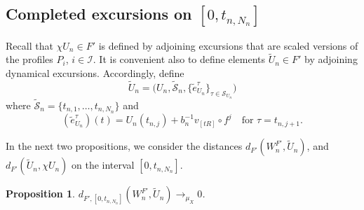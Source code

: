 \documentclass[12pt]{article}
\numberwithin{equation}{section}
\newtheorem{prop}[thm]{Proposition}
\newcommand{\cI}{{\mathcal I}}
\newcommand{\cS}{{\mathcal S}}
\newcommand{\tcS}{{\widetilde{\mathcal S}}}
\newcommand{\te}{{\tilde e}}
\newcommand{\tU}{{\widetilde U}}
\begin{document}
	\subsection{Completed excursions on $[0,t_{n,N_n}]$}
	\label{sec:comp}

	Recall that $\chi U_n \in F'$ is defined by adjoining excursions that are scaled versions of the profiles $P_i$, $i\in\cI$. It is convenient also to define elements
	$\tU_n\in F'$ by adjoining dynamical excursions. Accordingly, define
	\[
	\tU_n=\big(U_n,\tcS_n,\{\te_{U_n}^\tau\}_{\tau\in\cS_{U_n}}\big)
	\]
	where $\tcS_n=\{t_{n,1},\dots,t_{n,N_n}\}$ and
	\[
	(\te_{U_n}^\tau)(t)=U_n(t_{n,j})+b_n^{-1}v_{[tR]}\circ f^j
	\quad\text{for $\tau=t_{n,j+1}$.}
	\]

	In the next two propositions, we consider the distances
	$d_{F'}(W_n^{F'},\tU_n)$,
	and
	$d_{F'}(\tU_n,\chi U_n)$
	on the interval $[0,t_{n, N_n}]$.


	\begin{prop}  \label{prop:comp1}
	$d_{F',[0,t_{n,N_n}]}( W_n^{F'},\tU_n)\to_{\mu_X}0$.
	\end{prop}
\end{document}
